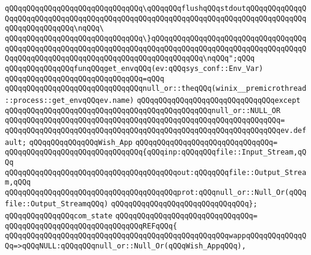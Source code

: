 \verb|qQQqqQQqqQQqqQQqqQQqqQQqqQQqqQQq\qQQqqQQqflushqQQqstdoutqQQqqQQqqQQqqQQqqQQqqQQqqQQqqQQqqQQqqQQqqQQqqQQqqQQqqQQqqQQqqQQqqQQqqQQqqQQqqQQqqQQqqQQqqQQqqQQqqQQq\nqQQq\|\newline
\verb|qQQqqQQqqQQqqQQqqQQqqQQqqQQqqQQq\}qQQqqQQqqQQqqQQqqQQqqQQqqQQqqQQqqQQqqQQqqQQqqQQqqQQqqQQqqQQqqQQqqQQqqQQqqQQqqQQqqQQqqQQqqQQqqQQqqQQqqQQqqQQqqQQqqQQqqQQqqQQqqQQqqQQqqQQqqQQqqQQqqQQqqQQq\nqQQq";qQQq|\newline
\newline
\newline
\verb|qQQqqQQqqQQqqQQqfunqQQqget_envqQQq(ev:qQQqsys_conf::Env_Var)|\newline
\verb|qQQqqQQqqQQqqQQqqQQqqQQqqQQqqQQq=qQQq|\newline
\verb|qQQqqQQqqQQqqQQqqQQqqQQqqQQqqQQqnull_or::theqQQq(winix__premicrothread::process::get_envqQQqev.name)|\newline
\verb|qQQqqQQqqQQqqQQqqQQqqQQqqQQqqQQqexcept|\newline
\verb|qQQqqQQqqQQqqQQqqQQqqQQqqQQqqQQqqQQqqQQqqQQqqQQqnull_or::NULL_OR|\newline
\verb|qQQqqQQqqQQqqQQqqQQqqQQqqQQqqQQqqQQqqQQqqQQqqQQqqQQqqQQqqQQqqQQq=|\newline
\verb|qQQqqQQqqQQqqQQqqQQqqQQqqQQqqQQqqQQqqQQqqQQqqQQqqQQqqQQqqQQqqQQqev.default;|\newline
\newline
\verb|qQQqqQQqqQQqqQQqWish_App|\newline
\verb|qQQqqQQqqQQqqQQqqQQqqQQqqQQqqQQq=|\newline
\verb|qQQqqQQqqQQqqQQqqQQqqQQqqQQqqQQq{qQQqinp:qQQqqQQqfile::Input_Stream,qQQq|\newline
\verb|qQQqqQQqqQQqqQQqqQQqqQQqqQQqqQQqqQQqqQQqout:qQQqqQQqfile::Output_Stream,qQQq|\newline
\verb|qQQqqQQqqQQqqQQqqQQqqQQqqQQqqQQqqQQqqQQqprot:qQQqnull_or::Null_Or(qQQqfile::Output_StreamqQQq)|\newline
\verb|qQQqqQQqqQQqqQQqqQQqqQQqqQQqqQQq};|\newline
\newline
\verb|qQQqqQQqqQQqqQQqcom_state|\newline
\verb|qQQqqQQqqQQqqQQqqQQqqQQqqQQqqQQq=|\newline
\verb|qQQqqQQqqQQqqQQqqQQqqQQqqQQqqQQqREFqQQq{|\newline
\verb|qQQqqQQqqQQqqQQqqQQqqQQqqQQqqQQqqQQqqQQqqQQqqQQqqQQqwappqQQqqQQqqQQqqQQq=>qQQqNULL:qQQqqQQqnull_or::Null_Or(qQQqWish_AppqQQq),|\newline
